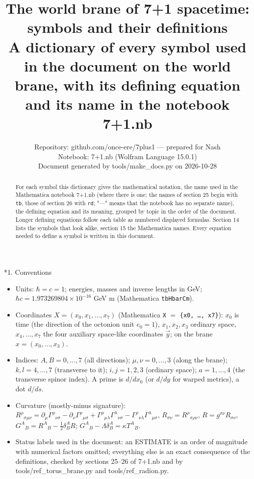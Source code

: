 \documentclass[10pt,a4paper]{article}
\makeatletter
\renewcommand\section{\@startsection{section}{1}{\z@}{-3.5ex \@plus -1ex \@minus -.2ex}{2.3ex \@plus.2ex}{\normalfont\Large\bfseries\raggedright}}
\makeatother
\begin{document}
\title{The world brane of 7+1 spacetime: symbols and their definitions\\[0.4em]\large A dictionary of every symbol used in the document on the world brane, with its defining equation and its name in the notebook 7+1.nb}
\author{Repository: github.com/once-ere/7plus1 — prepared for Nash\\ Notebook: 7+1.nb (Wolfram Language 15.0.1)\\ Document generated by tools/make\_docs.py on 2026-10-28}
\date{}
\maketitle
\begin{abstract}
For each symbol this dictionary gives the mathematical notation, the name used in the Mathematica notebook 7+1.nb (where there is one; the names of section 25 begin with \texttt{tb}, those of section 26 with \texttt{rd}; "—" means that the notebook has no separate name), the defining equation and its meaning, grouped by topic in the order of the document. Longer defining equations follow each table as numbered displayed formulas. Section 14 lists the symbols that look alike, section 15 the Mathematica names. Every equation needed to define a symbol is written in this document.
\end{abstract}
\tableofcontents
{}\section*{1. Conventions}
\begin{itemize}
\item Units: $\hbar=c=1$; energies, masses and inverse lengths in GeV; $\hbar c=1.973269804\times10^{-16}$ GeV m (Mathematica \texttt{tbHbarCm}).
\item Coordinates $X=(x_0,x_1,\dots,x_7)$ (Mathematica \texttt{X} $=$ \texttt{\{x0, …, x7\}}): $x_0$ is time (the direction of the octonion unit $e_0=1$), $x_1,x_2,x_3$ ordinary space, $x_4,\dots,x_7$ the four auxiliary space-like coordinates $\vec y$; on the brane $x=(x_0,\dots,x_3)$.
\item Indices: $A,B=0,\dots,7$ (all directions); $\mu,\nu=0,\dots,3$ (along the brane); $k,l=4,\dots,7$ (transverse to it); $i,j=1,2,3$ (ordinary space); $a=1,\dots,4$ (the transverse spinor index). A prime is $d/dx_0$ (or $d/dy$ for warped metrics), a dot $d/ds$.
\item Curvature (mostly-minus signature): $R^\rho{}_{\sigma\mu\nu}=\partial_\mu\Gamma^\rho{}_{\nu\sigma}-\partial_\nu\Gamma^\rho{}_{\mu\sigma}+\Gamma^\rho{}_{\mu\lambda}\Gamma^\lambda{}_{\nu\sigma}-\Gamma^\rho{}_{\nu\lambda}\Gamma^\lambda{}_{\mu\sigma}$, $R_{\sigma\nu}=R^\rho{}_{\sigma\rho\nu}$, $R=g^{\sigma\nu}R_{\sigma\nu}$, $G^A{}_B=R^A{}_B-\frac12\delta^A_BR$; $G^A{}_B-\Lambda\delta^A_B=\kappa T^A{}_B$.
\item Status labels used in the document: an ESTIMATE is an order of magnitude with numerical factors omitted; everything else is an exact consequence of the definitions, checked by sections 25–26 of 7+1.nb and by tools/ref\_torus\_brane.py and tools/ref\_radion.py.
\end{itemize}
\end{document}
